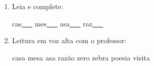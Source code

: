 \begin{exercicio}
\begin{enumerate}[resume]
\begin{enumerate}[label=(\alph*)]
    \item O som da unidade é: ( ) oral ( ) nasal 

    \item A primeira sílaba de CASA é: ( ) SA ( ) ZA

    \item As palavras da unidade aparecem: ( ) no início ( ) no meio ( ) no fim das palavras

  \end{enumerate}

  \item Leia e complete:
  \begin{center}
  cas\underline{~~~} \quad mes\underline{~~~} \quad asa\underline{~~~} \quad raz\underline{~~~}
  \end{center}

  \item Leitura em voz alta com o professor:
  \begin{center}
  casa \quad mesa \quad asa \quad razão \quad zero \quad zebra \quad poesia \quad visita
  \end{center}

\end{enumerate}

\end{exercicio}



